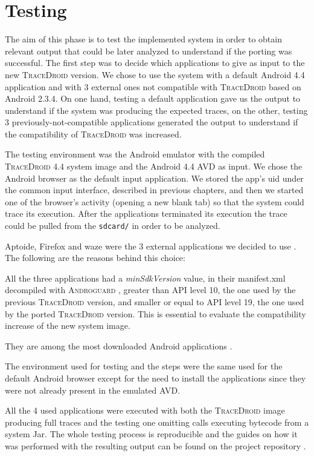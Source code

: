 \section{Testing}
\label{sec:eval_benchmarks}

The aim of this phase is to test the implemented system in order to
obtain relevant output that could be later analyzed to understand if
the porting was successful. The first step was to decide which
applications to give as input to the new \textsc{TraceDroid} version. We chose
to use the system with a default Android 4.4 application and with 3
external ones not compatible with \textsc{TraceDroid} based on Android
2.3.4. On one hand, testing a default application gave us the output
to understand if the system was producing the expected traces, on the
other, testing 3 previously-not-compatible applications generated the
output to understand if the compatibility of \textsc{TraceDroid} was increased.

The testing environment was the Android emulator with the compiled
\textsc{TraceDroid} 4.4 system image and the Android 4.4 AVD as input. We chose
the Android browser as the default input application. We stored the
app's uid under the common input interface, described in previous
chapters, and then we started one of the browser's activity (opening a
new blank tab) so that the system could trace its execution. After the
applications terminated its execution the trace could be pulled from
the \texttt{sdcard/} in order to be analyzed.

Aptoide, Firefox and waze were the 3 external applications we decided
to use \cite{ref23, ref24, ref25}. The following are the reasons behind this choice:
\begin{enumerate*}
  \item All the three applications had a \textit{minSdkVersion} value, in their
    manifest.xml decompiled with \textsc{Androguard} \cite{ref12}, greater
    than API level 10, the one used by the previous
    \textsc{TraceDroid} version, and smaller or equal to API level 19,
    the one used by the ported \textsc{TraceDroid} version. This is
    essential to evaluate the compatibility increase of the new system
    image.
  \item They are among the most downloaded Android applications \cite{ref26, ref27}.
\end{enumerate*}
The environment used for testing and the steps were the same used for
the default Android browser except for the need to install the
applications since they were not already present in the emulated AVD.

All the 4 used applications were executed with both the \textsc{TraceDroid}
image producing full traces and the testing one omitting
calls executing bytecode from a system Jar. The whole testing process
is reproducible and the guides on how it was performed with the
resulting output can be found on the project repository \cite{ref15}.
